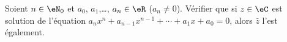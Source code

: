 \begin{exercice}\label{exoJanvier003}

Soient $n\in\eN_0$ et $a_0$, $a_1$,\ldots, $a_n\in\eR$ ($a_n\neq 0$). Vérifier que si $z\in\eC$ est solution de l'équation $a_nx^n+a_{n-1}x^{n-1}+\cdots+a_1x+a_0=0$, alors $\bar z$ l'est également.

\end{exercice}
